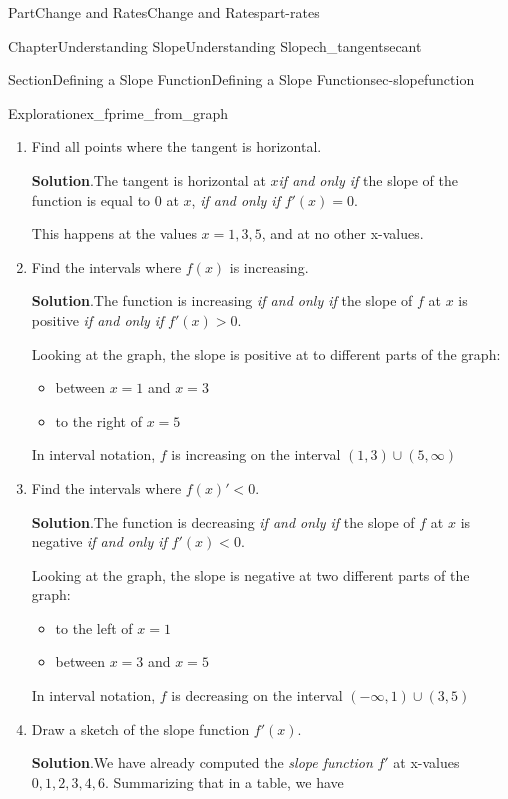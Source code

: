\documentclass{tufte-book}
\newcommand{\blocktitlefont}{\relax}
\numberwithin{equation}{chapter}
\newcommand{\lt}{<}
\newcommand{\gt}{>}
\begin{document}
\begin{partptx}{Part}{Change and Rates}{}{Change and Rates}{}{}{part-rates}
\begin{chapterptx}{Chapter}{Understanding Slope}{}{Understanding Slope}{}{}{ch_tangentsecant}
\begin{sectionptx}{Section}{Defining a Slope Function}{}{Defining a Slope Function}{}{}{sec-slopefunction}
\begin{exploration}{Exploration}{}{ex_fprime_from_graph}
\begin{enumerate}[font=\bfseries,label=(\alph*),ref=\alph*]
%
\item{}Find all points where the tangent is horizontal.%
\par\smallskip%
\noindent\textbf{\blocktitlefont Solution}.\hypertarget{ex_fprime_from_graph-3-2}{}\quad{}The tangent is horizontal at \(x\)\emph{if and only if} the slope of the function is equal to 0 at \(x\), \emph{if and only if} \(f'(x) = 0\).%
\par
This happens at the values \(x=1,3,5\), and at no other x-values.%
\item{}Find the intervals where \(f(x)\) is increasing.%
\par\smallskip%
\noindent\textbf{\blocktitlefont Solution}.\hypertarget{ex_fprime_from_graph-4-2}{}\quad{}The function is increasing \emph{if and only if} the slope of \(f\) at \(x\) is positive \emph{if and only if} \(f'(x)\gt 0\).%
\par
Looking at the graph, the slope is positive at to different parts of the graph:%
\begin{itemize}[label=\textbullet]
\item{}between \(x=1\) and \(x=3\)%
\item{}to the right of \(x=5\)%
\end{itemize}
In interval notation,  \(f\) is increasing on the interval \((1,3)\cup (5,\infty)\)%
\item{}Find the intervals where \(f(x)'\lt 0\).%
\par\smallskip%
\noindent\textbf{\blocktitlefont Solution}.\hypertarget{ex_fprime_from_graph-5-2}{}\quad{}The function is decreasing \emph{if and only if} the slope of \(f\) at \(x\) is negative \emph{if and only if} \(f'(x)\lt 0\).%
\par
Looking at the graph, the slope is negative at two different parts of the graph:%
\begin{itemize}[label=\textbullet]
\item{}to the left of \(x=1\)%
\item{}between \(x=3\) and \(x=5\)%
\end{itemize}
In interval notation,  \(f\) is decreasing on the interval \((-\infty,1)\cup (3,5)\)%
\item{}Draw a sketch of the slope function \(f'(x)\).%
\par\smallskip%
\noindent\textbf{\blocktitlefont Solution}.\hypertarget{ex_fprime_from_graph-6-2}{}\quad{}We have already computed the \emph{slope function} \(f'\) at x-values \(0,1,2,3,4,6\).  Summarizing that in a table, we have \begin{center}%

\end{center}
\end{enumerate}
\end{exploration}
\end{sectionptx}
\end{chapterptx}
\end{partptx}
\end{document}
